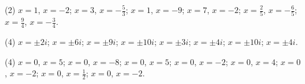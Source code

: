 \documentclass[11pt,a4paper]{scrartcl}
\begin{document}
\begin{problem} \phantom{text}
\begin{tasks}[label={(\arabic*)}, label-offset=0.9em](2)
    \task $x=1$, $x=-2$;
    \task $x=3$, $x=-\frac{5}{3}$;
    \task $x=1$, $x=-9$;
    \task $x=7$, $x=-2$;
    \task $x=\frac{2}{5}$, $x=-\frac{6}{5}$;
    \task $x=\frac{9}{4}$, $x=-\frac{3}{4}$.
\end{tasks}
\end{problem}

\begin{problem} \phantom{text}
\begin{tasks}[label={(\arabic*)}, label-offset=0.9em](4)
    \task $x=\pm 2i$;
    \task $x=\pm 6i$;
    \task $x=\pm 9i$;
    \task $x=\pm 10i$;
    \task $x=\pm 3i$;
    \task $x=\pm 4i$;
    \task $x=\pm 10i$;
    \task $x=\pm 4i$.
\end{tasks}
\end{problem}

\begin{problem} \phantom{text}
\begin{tasks}[label={(\arabic*)}, label-offset=0.9em](4)
    \task $x=0$, $x=5$;
    \task $x=0$, $x=-8$;
    \task $x=0$, $x=5$;
    \task $x=0$, $x=-2$;
    \task $x=0$, $x=4$;
    \task $x=0$, $x=-2$;
    \task $x=0$, $x=\frac{1}{2}$;
    \task $x=0$, $x=-2$.
\end{tasks}
\end{problem}
\end{document}
